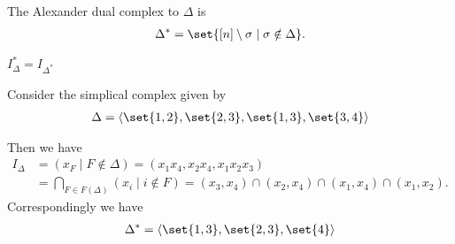 \begin{definition}
    The Alexander dual complex to $\Delta$ is
    \begin{align*}
        \Delta^* = \set{ [n] \setminus \sigma \mid \sigma \notin \Delta}.
    \end{align*}
\end{definition}

\begin{lemma}
    $I_\Delta^* = I_{\Delta^*}$
\end{lemma}

\begin{example}
    Consider the simplical complex given by
    \begin{align*}
        \Delta = \langle \set{ 1,2 } , \set{ 2,3 } , \set{ 1,3 } , \set{ 3,4 } \rangle
    \end{align*}
    \begin{center}
    \end{center}
    Then we have
    \begin{align*}
        I_\Delta &= ( x_F \mid F \notin \Delta ) = ( x_1  x_4, x_2 x_4 , x_1 x_2 x_3 )\\
        &=  \bigcap_{F \in F(\Delta)} (x_i \mid i \notin F) = ( x_3, x_4 ) \cap ( x_2 , x_4 ) \cap ( x_1 , x_4) \cap ( x_1 , x_2 ).
    \end{align*}
    Correspondingly we have
    \begin{align*}
        \Delta^* = \langle \set{ 1,3 } , \set{ 2,3 } , \set{ 4 } \rangle
    \end{align*}
    \begin{center}
\end{center}
\end{example}
